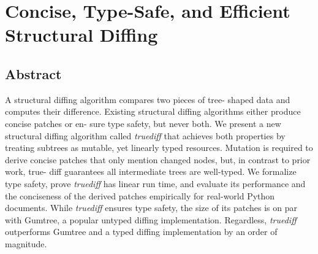 \chapter{Concise, Type-Safe, and Efficient Structural Diffing}

\section{Abstract}
A structural diffing algorithm compares two pieces of tree- shaped data and computes their difference. Existing structural diffing algorithms either produce concise patches or en- sure type safety, but never both. We present a new structural diffing algorithm called \textit{truediff} that achieves both properties by treating subtrees as mutable, yet linearly typed resources. Mutation is required to derive concise patches that only mention changed nodes, but, in contrast to prior work, true- diff guarantees all intermediate trees are well-typed. We formalize type safety, prove \textit{truediff} has linear run time, and evaluate its performance and the conciseness of the derived patches empirically for real-world Python documents. While \textit{truediff} ensures type safety, the size of its patches is on par with Gumtree, a popular untyped diffing implementation. Regardless, \textit{truediff} outperforms Gumtree and a typed diffing implementation by an order of magnitude.

